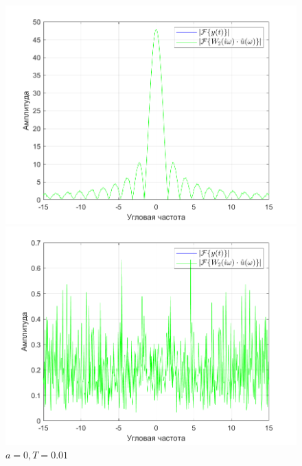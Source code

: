 \documentclass[a4paper]{article}
\begin{document}
\begin{figure}[H]
    \begin{minipage}{0.5\textwidth}
        \centering
        \includegraphics[width=\linewidth]{ex1_1/a=-3_T=0.01/h4.png}
        \caption{$a = -3, T = 0.01$}
    \end{minipage}
    \begin{minipage}{0.5\textwidth}
        \centering
        \includegraphics[width=\linewidth]{ex1_1/a=0_T=0.01/h4.png}
        \caption{$a = 0, T = 0.01$}
    \end{minipage}
\end{figure}
\end{document}
